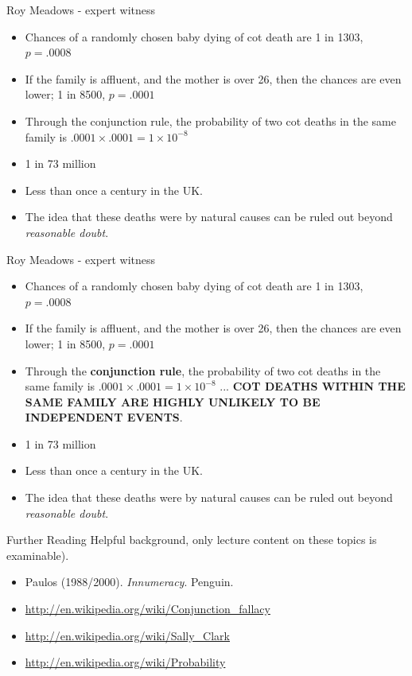 \documentclass{beamer}
\begin{document}
\begin{frame}{Roy Meadows - expert witness}
\begin{itemize}
\item Chances of a randomly chosen baby dying of cot death are 1 in 1303, $p = .0008$
\item If the family is affluent, and the mother is over 26, then the chances are even lower; 1 in 8500, $p = .0001$
\item Through the conjunction rule, the probability of two cot deaths in the same family is $ .0001 \times .0001 = 1 \times 10^{-8}$
\item 1 in 73 million
\item Less than once a century in the UK.
\item The idea that these deaths were by natural causes can be ruled out beyond \emph{reasonable doubt}.
\end{itemize}
\end{frame}

\begin{frame}{Roy Meadows - expert witness}
\begin{itemize}
\item Chances of a randomly chosen baby dying of cot death are 1 in 1303, $p = .0008$
\item If the family is affluent, and the mother is over 26, then the chances are even lower; 1 in 8500, $p = .0001$
\item Through the \textbf{conjunction rule}, the probability of two cot deaths in the same family is $ .0001 \times .0001 = 1 \times 10^{-8}$ ... \textbf{COT DEATHS WITHIN THE SAME FAMILY ARE HIGHLY UNLIKELY TO BE INDEPENDENT EVENTS}.
\item 1 in 73 million
\item Less than once a century in the UK.
\item The idea that these deaths were by natural causes can be ruled out beyond \emph{reasonable doubt}.
\end{itemize}
\end{frame}

\begin{frame}{Further Reading}
Helpful background, only lecture content on these topics is examinable).
\begin{itemize}
\item Paulos (1988/2000). \emph{Innumeracy}. Penguin.
\item  \url{http://en.wikipedia.org/wiki/Conjunction_fallacy}
\item  \url{http://en.wikipedia.org/wiki/Sally_Clark}
\item  \url{http://en.wikipedia.org/wiki/Probability}
\end{itemize}
\end{frame}
\end{document}
